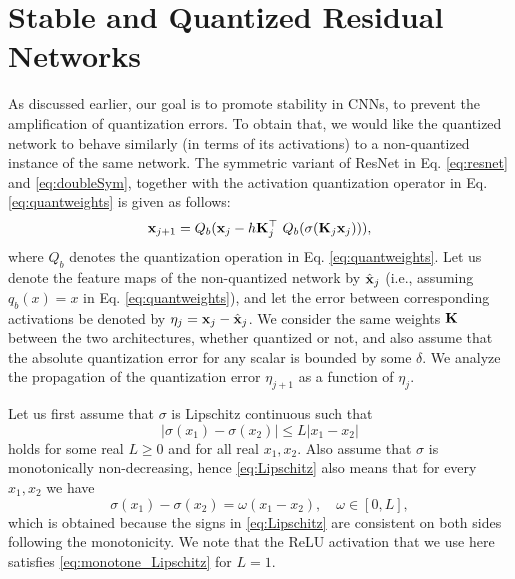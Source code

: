 \documentclass[reqno]{amsart}
\newcommand{\bfx}{ {\bf x}}
\newcommand{\bfK}{{\bf K}}
\begin{document}
\section{Stable and Quantized Residual Networks}
\label{sec:stable_nets}
As discussed earlier, our goal is to promote stability in CNNs, to prevent the amplification of quantization errors. To obtain that, we would like the quantized network to behave similarly (in terms of its activations) to a non-quantized instance of the same network. The symmetric variant of ResNet in Eq. \eqref{eq:resnet} and \eqref{eq:doubleSym}, together with the activation quantization operator in Eq. \eqref{eq:quantweights} is given as follows:
\begin{equation}
\label{eq:stable_quant_sym_resnet}
    \bfx_{j+1} = Q_b(\bfx_j - h \bfK_j^\top\ Q_b(\sigma(\bfK_j\bfx_j))),
\end{equation}
where $Q_b$ denotes the quantization operation in Eq. \eqref{eq:quantweights}.
Let us denote the feature maps of the non-quantized network by $\hat\bfx_j$ (i.e., assuming $q_b(x) = x$ in Eq. \eqref{eq:quantweights}), and let the error between corresponding activations be denoted by $\eta_j = \bfx_j - \hat\bfx_j$. We consider the same weights $\bfK$ between the two architectures, whether quantized or not, and also assume that the absolute quantization error for any scalar is bounded by some $\delta$. We analyze the propagation of the quantization error $\eta_{j+1}$ as a function of $\eta_{j}$.

Let us first assume that $\sigma$ is Lipschitz continuous such that 
\begin{equation}
\label{eq:Lipschitz}
    \vert \sigma(x_1) - \sigma(x_2) \vert \leq L \vert x_1 - x_2 \vert
\end{equation}
holds for some real $L \geq 0$ and for all real $x_1, x_2$. Also assume that $\sigma$ is monotonically non-decreasing, hence \eqref{eq:Lipschitz} also means that for every $x_1,x_2$ we have 
\begin{equation}
\label{eq:monotone_Lipschitz}
    \sigma(x_1) - \sigma(x_2)  = \omega (x_1 - x_2),\quad  \omega\in [0, L],
\end{equation}
which is obtained because the signs in \eqref{eq:Lipschitz} are consistent on both sides following the monotonicity. We note that the ReLU activation that we use here satisfies \eqref{eq:monotone_Lipschitz} for $L=1$.
\end{document}
